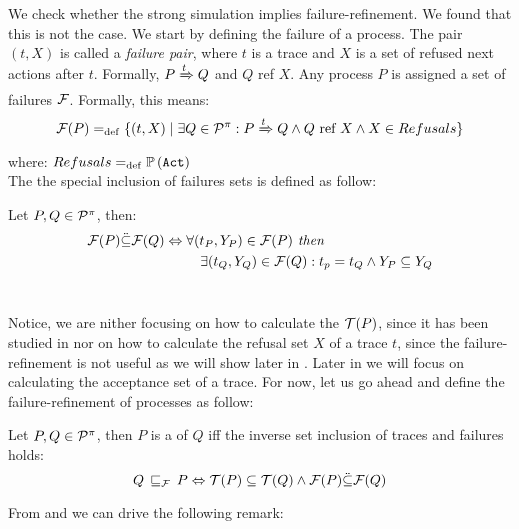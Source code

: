 We check whether the strong simulation implies failure-refinement. We found that this is not the case. We start by defining the failure of a process.
The pair $(t, X)$ is called a \textit{failure pair}, where $t$ is a trace and $X$ is a set of refused next actions after $t$. Formally, $P \xRightarrow{t} Q$ and $Q$ ref $X$. Any process
$P$ is assigned a set of failures $\Failures[]$. Formally, this means:
\begin{align}
    \Failures[P] \define \{(t,X) \mid \exists Q\in\procs: P \bigstep{t} Q \wedge Q \text{ ref } X \wedge X\in Refusals\}
\end{align}
where: $Refusals =_{\mathrm{def}} \mathbb P\left(\mathtt{Act}\right)$
\\The the special inclusion of failures sets is defined as follow:
\begin{definition}
\label{def_failure_inclutuion_ref}
Let $P,Q\in\mathcal P^{\pi}$, then:
\begin{equation*}
\begin{aligned}
\Failures[P] \ddot{\subseteq} \Failures[Q] \Leftrightarrow {} & \forall (t_P, Y_P) \in \Failures[P] \textit{ then }\\
      & \ \ \ \exists (t_Q, Y_Q) \in \Failures[Q]: t_p = t_Q \wedge Y_P \subseteq Y_Q
\end{aligned}
\end{equation*}
\ 
\end{definition}
Notice, we are nither focusing on how to calculate the $\Traces[P]$, since it has been studied in \cite{gieseking} nor on how to calculate the refusal set $X$ of a trace $t$, since the failure-refinement is not useful as we will show later in . Later in  we will focus on calculating the acceptance set of a trace.
For now, let us go ahead and define the failure-refinement of \picalc{} processes as follow: 
\begin{definition}
\label{def_failure_ref}
	Let $P,Q\in\mathcal P^{\pi}$, then $P$ is a  of $Q$ iff the inverse set inclusion of traces and failures holds:
   \[Q \refiF P \Leftrightarrow  \Traces[P]\subseteq\Traces[Q] \wedge \Failures[P]\ddot{\subseteq}\Failures[Q]\]
\end{definition}

From  and  we can drive the following remark: 

